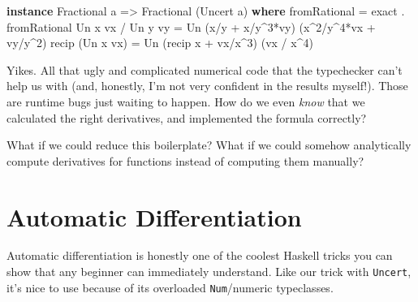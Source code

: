 \documentclass[]{article}
\newenvironment{Shaded}{}{}
\newcommand{\DataTypeTok}[1]{\textcolor[rgb]{0.56,0.13,0.00}{#1}}
\newcommand{\DecValTok}[1]{\textcolor[rgb]{0.25,0.63,0.44}{#1}}
\newcommand{\FunctionTok}[1]{\textcolor[rgb]{0.02,0.16,0.49}{#1}}
\newcommand{\KeywordTok}[1]{\textcolor[rgb]{0.00,0.44,0.13}{\textbf{#1}}}
\newcommand{\NormalTok}[1]{#1}
\newcommand{\OperatorTok}[1]{\textcolor[rgb]{0.40,0.40,0.40}{#1}}
\newcommand{\OtherTok}[1]{\textcolor[rgb]{0.00,0.44,0.13}{#1}}
\begin{document}
\begin{Shaded}
\begin{Highlighting}[]
\KeywordTok{instance} \DataTypeTok{Fractional}\NormalTok{ a }\OtherTok{=\textgreater{}} \DataTypeTok{Fractional}\NormalTok{ (}\DataTypeTok{Uncert}\NormalTok{ a) }\KeywordTok{where}
    \FunctionTok{fromRational}      \OtherTok{=}\NormalTok{ exact }\OperatorTok{.} \FunctionTok{fromRational}
    \DataTypeTok{Un}\NormalTok{ x vx }\OperatorTok{/} \DataTypeTok{Un}\NormalTok{ y vy }\OtherTok{=} \DataTypeTok{Un}\NormalTok{ (x}\OperatorTok{/}\NormalTok{y }\OperatorTok{+}\NormalTok{ x}\OperatorTok{/}\NormalTok{y}\OperatorTok{\^{}}\DecValTok{3}\OperatorTok{*}\NormalTok{vy)   (x}\OperatorTok{\^{}}\DecValTok{2}\OperatorTok{/}\NormalTok{y}\OperatorTok{\^{}}\DecValTok{4}\OperatorTok{*}\NormalTok{vx }\OperatorTok{+}\NormalTok{ vy}\OperatorTok{/}\NormalTok{y}\OperatorTok{\^{}}\DecValTok{2}\NormalTok{)}
    \FunctionTok{recip}\NormalTok{ (}\DataTypeTok{Un}\NormalTok{ x vx)   }\OtherTok{=} \DataTypeTok{Un}\NormalTok{ (}\FunctionTok{recip}\NormalTok{ x }\OperatorTok{+}\NormalTok{ vx}\OperatorTok{/}\NormalTok{x}\OperatorTok{\^{}}\DecValTok{3}\NormalTok{) (vx }\OperatorTok{/}\NormalTok{ x}\OperatorTok{\^{}}\DecValTok{4}\NormalTok{)}
\end{Highlighting}
\end{Shaded}

Yikes. All that ugly and complicated numerical code that the typechecker can't
help us with (and, honestly, I'm not very confident in the results myself!).
Those are runtime bugs just waiting to happen. How do we even \emph{know} that
we calculated the right derivatives, and implemented the formula correctly?

What if we could reduce this boilerplate? What if we could somehow analytically
compute derivatives for functions instead of computing them manually?

\section{Automatic Differentiation}\label{automatic-differentiation}

Automatic differentiation is honestly one of the coolest Haskell tricks you can
show that any beginner can immediately understand. Like our trick with
\texttt{Uncert}, it's nice to use because of its overloaded \texttt{Num}/numeric
typeclasses.
\end{document}
